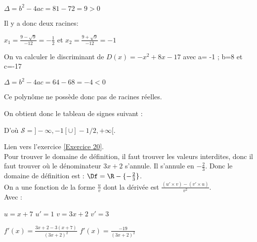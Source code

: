\documentclass[12pt,fleqn]{report} %
\begin{document}
\begin{correction}
\begin{enumerate}
{			$
			\Delta = b^2-4ac = 81-72 = 9>0
			$
			
			Il y a donc deux racines:
			
			$x_1=\frac{9-\sqrt{9}}{-12}=-\frac{1}{2}$ et $x_2=\frac{9+\sqrt{9}}{-12}=-1$
			
			On va calculer le discriminant de $D(x)=-x^2+8x-17$ avec a= -1 ; b=8 et c=-17
			
			$
			\Delta = b^2-4ac=64-68=-4<0
			$
			
			Ce polynôme ne possède donc pas de racines réelles.
			
			On obtient donc le tableau de signes suivant :
			
			\begin{center}
			\end{center}	
		}
		D'où $\mathcal{S} = ]-\infty, -1[ \cup ]-1/2,+\infty[.$
	\end{enumerate}
\end{correction}

\begin{correction}Lien vers l'exercice   \ref{Exercice 20}.\\
	Pour trouver le domaine de définition, il faut trouver les valeurs interdites, donc il faut trouver où le dénominateur $3x+2$ s'annule. Il s'annule en $-\frac{2}{3}$. Donc le domaine de définition est : $\Df = \R-\lbrace -\frac{2}{3} \rbrace$.\\ 
	On a une fonction de la forme $\frac{u}{v}$ dont la dérivée est $\frac{(u'\times v)-(v'\times u)}{v^2}$. \\ Avec :
	\begin{center}
		$u=x+7$ \qquad $u'=1$ \qquad $v=3x+2$ \qquad $v'=3$ \newline
	\end{center}
	$f'(x)= \frac{3x+2-3(x+7)}{(3x+2)^2}$
	\newline\newline $f'(x)= \frac{-19}{(3x+2)^2}$\newline 
	\begin{center}
	\end{center}
\end{correction}
\end{document}
